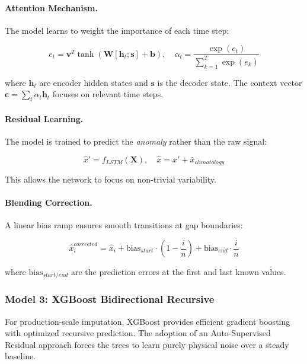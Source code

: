\documentclass[12pt,a4paper]{article}
\begin{document}
\paragraph{Attention Mechanism.} The model learns to weight the importance of each time step:

\begin{equation}
    e_t = \mathbf{v}^T \tanh(\mathbf{W}[\mathbf{h}_t; \mathbf{s}] + \mathbf{b}), \quad
    \alpha_t = \frac{\exp(e_t)}{\sum_{k=1}^{T} \exp(e_k)}
\end{equation}

where $\mathbf{h}_t$ are encoder hidden states and $\mathbf{s}$ is the decoder state. The context vector $\mathbf{c} = \sum_t \alpha_t \mathbf{h}_t$ focuses on relevant time steps.

\paragraph{Residual Learning.} The model is trained to predict the \textit{anomaly} rather than the raw signal:

\begin{equation}
    \hat{x}' = f_{LSTM}(\mathbf{X}), \quad \hat{x} = \hat{x}' + \bar{x}_{climatology}
\end{equation}

This allows the network to focus on non-trivial variability.

\paragraph{Blending Correction.} A linear bias ramp ensures smooth transitions at gap boundaries:

\begin{equation}
    \hat{x}_i^{corrected} = \hat{x}_i + \text{bias}_{start} \cdot \left(1 - \frac{i}{n}\right) + \text{bias}_{end} \cdot \frac{i}{n}
\end{equation}

where $\text{bias}_{start/end}$ are the prediction errors at the first and last known values.

\subsubsection{Model 3: XGBoost Bidirectional Recursive}

For production-scale imputation, XGBoost provides efficient gradient boosting \cite{chen2016xgboost} with optimized recursive prediction. The adoption of an Auto-Supervised Residual approach forces the trees to learn purely physical noise over a steady baseline.
\end{document}
